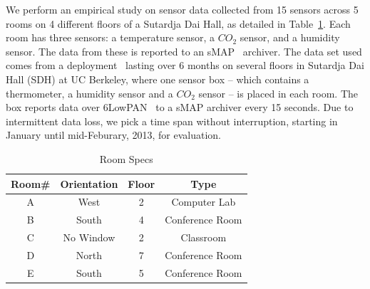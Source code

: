 We perform an empirical study on sensor data collected from 15 sensors across 5 rooms on 4 different floors of a Sutardja Dai Hall, 
as detailed in Table~\ref{table:roomspec}. 
Each room has three sensors: a temperature sensor, a $CO_{2}$ sensor,  and a humidity sensor. 
The data from these is reported to an sMAP~\cite{smap} archiver. The data set used comes from a deployment~\cite{Jay} lasting 
over 6 months on several floors in Sutardja Dai Hall (SDH) at UC Berkeley, where one sensor box -- which contains a thermometer, 
a humidity sensor and a $CO_{2}$ sensor -- is placed in each room. The box reports data over 6LowPAN~\cite{6lowpan} to a sMAP archiver 
every 15 seconds. 
Due to intermittent data loss, we pick a time span without interruption, starting in January until mid-Feburary, 2013, for evaluation.

\begin{table}[ht!]
\caption{Room Specs}
\centering %
\begin{tabular}{c c c c}%
\hline %
Room\# & Orientation & Floor & Type \\ %
\hline\hline %
A & West & 2 & Computer Lab \\ %
B & South & 4 & Conference Room \\
C & No Window & 2 & Classroom \\
D & North & 7 & Conference Room \\
E & South & 5 & Conference Room \\ %
\hline %
\end{tabular}
\label{table:roomspec} %
\end{table}

